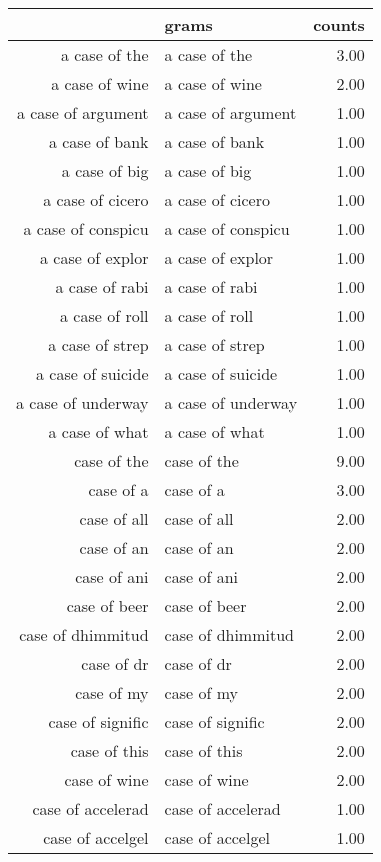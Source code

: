 \begin{table}[ht]
\centering
\begin{tabular}{rlr}
  \hline
 & grams & counts \\ 
  \hline
a case of the & a case of the & 3.00 \\ 
  a case of wine & a case of wine & 2.00 \\ 
  a case of argument & a case of argument & 1.00 \\ 
  a case of bank & a case of bank & 1.00 \\ 
  a case of big & a case of big & 1.00 \\ 
  a case of cicero & a case of cicero & 1.00 \\ 
  a case of conspicu & a case of conspicu & 1.00 \\ 
  a case of explor & a case of explor & 1.00 \\ 
  a case of rabi & a case of rabi & 1.00 \\ 
  a case of roll & a case of roll & 1.00 \\ 
  a case of strep & a case of strep & 1.00 \\ 
  a case of suicide & a case of suicide & 1.00 \\ 
  a case of underway & a case of underway & 1.00 \\ 
  a case of what & a case of what & 1.00 \\ 
  case of the & case of the & 9.00 \\ 
  case of a & case of a & 3.00 \\ 
  case of all & case of all & 2.00 \\ 
  case of an & case of an & 2.00 \\ 
  case of ani & case of ani & 2.00 \\ 
  case of beer & case of beer & 2.00 \\ 
  case of dhimmitud & case of dhimmitud & 2.00 \\ 
  case of dr & case of dr & 2.00 \\ 
  case of my & case of my & 2.00 \\ 
  case of signific & case of signific & 2.00 \\ 
  case of this & case of this & 2.00 \\ 
  case of wine & case of wine & 2.00 \\ 
  case of accelerad & case of accelerad & 1.00 \\ 
  case of accelgel & case of accelgel & 1.00 \\ 

\end{tabular}
\end{table}
